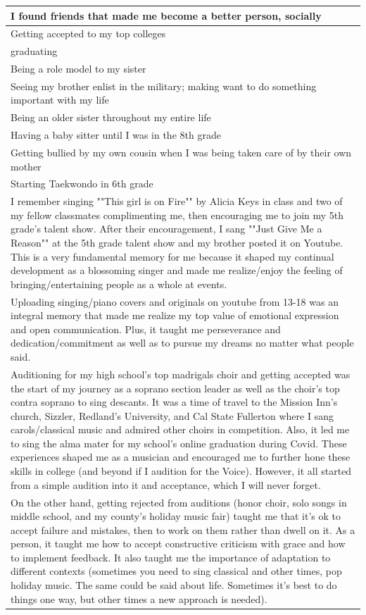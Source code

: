 \documentclass[
  .7em,
  letterpaper,
  DIV=11,
  numbers=noendperiod]{scrartcl}
\begin{document}
\begin{table}
\begin{tabular}{l}
\hline
I found friends that made me become a better person, socially\\
\hline
Getting accepted to my top colleges\\
\hline
graduating\\
\hline
Being a role model to my sister\\
\hline
Seeing my brother enlist in the military; making want to do something important with my life\\
\hline
Being an older sister throughout my entire life\\
\hline
Having a baby sitter until I was in the 8th grade\\
\hline
Getting bullied by my own cousin when I was being taken care of by their own mother\\
\hline
Starting Taekwondo in 6th grade\\
\hline
I remember singing ""This girl is on Fire"" by Alicia Keys in class and two of my fellow classmates complimenting me, then encouraging me to join my 5th grade's talent show. After their encouragement, I sang ""Just Give Me a Reason"" at the 5th grade talent show and my brother posted it on Youtube. This is a very fundamental memory for me because it shaped my continual development as a blossoming singer and made me realize/enjoy the feeling of bringing/entertaining people as a whole at events.\\
\hline
Uploading singing/piano covers and originals on youtube from 13-18 was an integral memory that made me realize my top value of emotional expression and open communication. Plus, it taught me perseverance and dedication/commitment as well as to pursue my dreams no matter what people said.\\
\hline
Auditioning for my high school's top madrigals choir and getting accepted was the start of my journey as a soprano section leader as well as the choir's top contra soprano to sing descants. It was a time of travel to the Mission Inn's church, Sizzler, Redland's University, and Cal State Fullerton where I sang carols/classical music and admired other choirs in competition. Also, it led me to sing the alma mater for my school's online graduation during Covid. These experiences shaped me as a musician and encouraged me to further hone these skills in college (and beyond if I audition for the Voice). However, it all started from a simple audition into it and acceptance, which I will never forget.\\
\hline
On the other hand, getting rejected from auditions (honor choir, solo songs in middle school, and my county's holiday music fair) taught me that it's ok to accept failure and mistakes, then to work on them rather than dwell on it. As a person, it taught me how to accept constructive criticism with grace and how to implement feedback. It also taught me the importance of adaptation to different contexts (sometimes you need to sing classical and other times, pop holiday music. The same could be said about life. Sometimes it's best to do things one way, but other times a new approach is needed).\\

\end{tabular}
\end{table}
\end{document}
